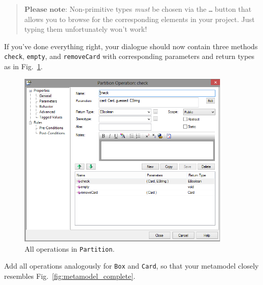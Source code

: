 \vspace{-.5cm}
\begin{quote}
$\textbf{Please note:}$ Non-primitive types \emph{must} be chosen via the \texttt{\ldots} button that allows you to browse for the corresponding elements in your project.
Just typing them unfortunately won't work!
\end{quote}
\vspace{-.5cm}

If you've done everything right, your dialogue should now contain three methods \texttt{check}, \texttt{empty}, and \texttt{removeCard} with corresponding parameters and return types as in Fig.~\ref{fig:operation_partition}.
\begin{figure}[htbp]
	\centering
  \includegraphics[width=0.9\textwidth]{pics/memBoxBilder/memBox39}
	\caption{All operations in \texttt{Partition}.}
	\label{fig:operation_partition}
\end{figure}

Add all operations analogously for \texttt{Box} and \texttt{Card}, so that your metamodel closely resembles Fig.~\ref{fig:metamodel_complete}.

